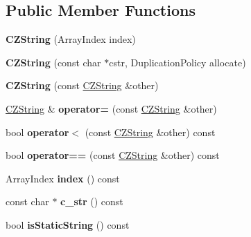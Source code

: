 \subsection*{Public Member Functions}
\begin{DoxyCompactItemize}
\item 
\hypertarget{class_json_1_1_value_1_1_c_z_string_a4b8aa6eaabdec78cffec96e088da996f}{{\bfseries C\-Z\-String} (Array\-Index index)}\label{class_json_1_1_value_1_1_c_z_string_a4b8aa6eaabdec78cffec96e088da996f}

\item 
\hypertarget{class_json_1_1_value_1_1_c_z_string_a8b1f1afc46eb28e099ff39d20ae7fb79}{{\bfseries C\-Z\-String} (const char $\ast$cstr, Duplication\-Policy allocate)}\label{class_json_1_1_value_1_1_c_z_string_a8b1f1afc46eb28e099ff39d20ae7fb79}

\item 
\hypertarget{class_json_1_1_value_1_1_c_z_string_a4e3e7c07855ecf7a20417dedd6790947}{{\bfseries C\-Z\-String} (const \hyperlink{class_json_1_1_value_1_1_c_z_string}{C\-Z\-String} \&other)}\label{class_json_1_1_value_1_1_c_z_string_a4e3e7c07855ecf7a20417dedd6790947}

\item 
\hypertarget{class_json_1_1_value_1_1_c_z_string_aba1b28d22cdd1eaad1c17f8844af9d4a}{\hyperlink{class_json_1_1_value_1_1_c_z_string}{C\-Z\-String} \& {\bfseries operator=} (const \hyperlink{class_json_1_1_value_1_1_c_z_string}{C\-Z\-String} \&other)}\label{class_json_1_1_value_1_1_c_z_string_aba1b28d22cdd1eaad1c17f8844af9d4a}

\item 
\hypertarget{class_json_1_1_value_1_1_c_z_string_a1fdef0752c6ffe3cd61f227f869d2735}{bool {\bfseries operator$<$} (const \hyperlink{class_json_1_1_value_1_1_c_z_string}{C\-Z\-String} \&other) const }\label{class_json_1_1_value_1_1_c_z_string_a1fdef0752c6ffe3cd61f227f869d2735}

\item 
\hypertarget{class_json_1_1_value_1_1_c_z_string_a69bb79f479d2b67966549107a94e46d2}{bool {\bfseries operator==} (const \hyperlink{class_json_1_1_value_1_1_c_z_string}{C\-Z\-String} \&other) const }\label{class_json_1_1_value_1_1_c_z_string_a69bb79f479d2b67966549107a94e46d2}

\item 
\hypertarget{class_json_1_1_value_1_1_c_z_string_a4e9f305dbc4a4700abd955fde673a01c}{Array\-Index {\bfseries index} () const }\label{class_json_1_1_value_1_1_c_z_string_a4e9f305dbc4a4700abd955fde673a01c}

\item 
\hypertarget{class_json_1_1_value_1_1_c_z_string_a53dafbbde83110d4cb53db5482fa6192}{const char $\ast$ {\bfseries c\-\_\-str} () const }\label{class_json_1_1_value_1_1_c_z_string_a53dafbbde83110d4cb53db5482fa6192}

\item 
\hypertarget{class_json_1_1_value_1_1_c_z_string_af3cc02b77c2cd79d4646fcea3575c1fd}{bool {\bfseries is\-Static\-String} () const }\label{class_json_1_1_value_1_1_c_z_string_af3cc02b77c2cd79d4646fcea3575c1fd}

\end{DoxyCompactItemize}
